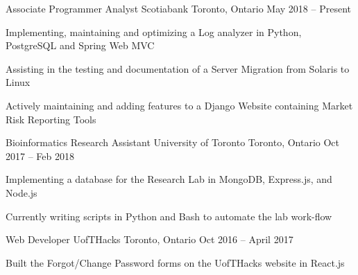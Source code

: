 \begin{cventries}
\cventry
    {Associate Programmer Analyst}
    {Scotiabank}
    {Toronto, Ontario}
    {May 2018 -- Present}
    {
      \begin{cvitems}
        \item {Implementing, maintaining and optimizing a Log analyzer in Python, PostgreSQL and Spring Web MVC}
        \item {Assisting in the testing and documentation of a Server Migration from Solaris to Linux}
        \item {Actively maintaining and adding features to a Django Website containing Market Risk Reporting Tools}
      \end{cvitems}
    }

\cventry
    {Bioinformatics Research Assistant}
    {University of Toronto}
    {Toronto, Ontario}
    {Oct 2017 -- Feb 2018}
    {
      \begin{cvitems}
        \item {Implementing a database for the Research Lab in MongoDB, Express.js, and Node.js}
        \item {Currently writing scripts in Python and Bash to automate the lab work-flow}
      \end{cvitems}
    }
\cventry
    {Web Developer}
    {UofTHacks}
    {Toronto, Ontario}
    {Oct 2016 -- April 2017}
    {
      \begin{cvitems}
        \item {Built the Forgot/Change Password forms on the UofTHacks website in React.js}
      \end{cvitems}
    }
\end{cventries}
